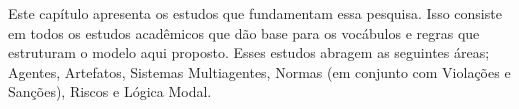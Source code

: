 Este capítulo apresenta os estudos que fundamentam essa pesquisa. Isso consiste em todos os estudos acadêmicos que dão base para os vocábulos e regras que estruturam o modelo aqui proposto. Esses estudos abragem as seguintes áreas; Agentes, Artefatos, Sistemas Multiagentes, Normas (em conjunto com Violações e Sanções), Riscos e Lógica Modal. 